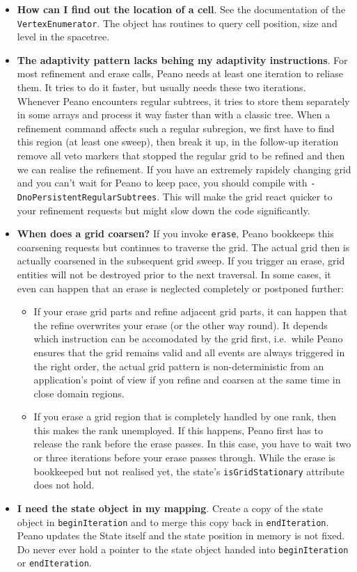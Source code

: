 \begin{itemize}
  \item {\bf How can I find out the location of a cell}. See the documentation
  of the \texttt{VertexEnumerator}. The object has routines to query cell
  position, size and level in the spacetree.
  \item {\bf The adaptivity pattern lacks behing my adaptivity instructions}.
  For most refinement and erase calls, Peano needs at least one iteration to
  reliase them. It tries to do it faster, but usually needs these two
  iterations. Whenever Peano encounters regular subtrees, it tries to store 
  them separately in some arrays and process it way faster than with a classic
  tree. When a refinement command affects such a regular subregion, we first 
  have to find this region (at least one sweep), then break it up, in the
  follow-up iteration remove all veto markers that stopped the regular grid to
  be refined and then we can realise the refinement. If you have an extremely
  rapidely changing grid and you can't wait for Peano to keep pace, you should
  compile with \texttt{-DnoPersistentRegularSubtrees}. This will make the grid
  react quicker to your refinement requests but might slow down the code
  significantly.
  \item {\bf When does a grid coarsen?} If you invoke \texttt{erase}, Peano
  bookkeeps this coarsening requests but continues to traverse the grid. The
  actual grid then is actually coarsened in the subsequent grid sweep. If you
  trigger an erase, grid entities will not be destroyed prior to the next
  traversal. In some cases, it even can happen that an erase is neglected
  completely or postponed further:
  \begin{itemize}
    \item If your erase grid parts and refine adjacent grid parts, it can happen
    that the refine overwrites your erase (or the other way round). It depends
    which instruction can be accomodated by the grid first, i.e.~while Peano
    ensures that the grid remains valid and all events are always triggered in
    the right order, the actual grid pattern is non-deterministic from an
    application's point of view if you refine and coarsen at the same time in
    close domain regions.
    \item If you erase a grid region that is completely handled by one rank,
    then this makes the rank unemployed. If this happens, Peano first has to
    release the rank before the erase passes. In this case, you have to wait two
    or three iterations before your erase passes through. While the erase is
    bookkeeped but not realised yet, the state's \texttt{isGridStationary}
    attribute does not hold.
  \end{itemize}
  \item {\bf I need the state object in my mapping}. Create a copy of the state
  object in \texttt{beginIteration} and to merge this copy back in \texttt{endIteration}. 
  Peano updates the State itself and the state position in memory is not fixed.
  Do never ever hold a pointer to the state object handed into
  \texttt{beginIteration} or \texttt{endIteration}.
\end{itemize}


